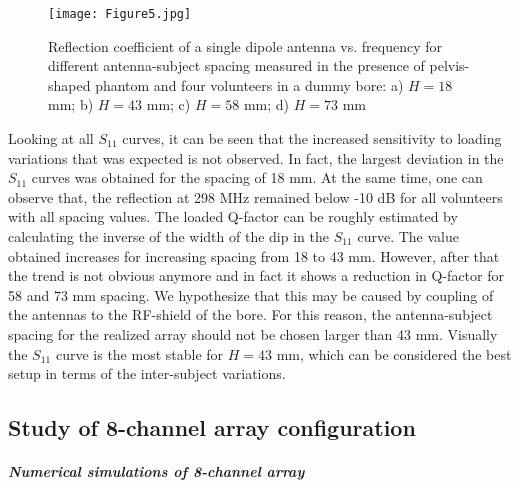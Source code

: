 \documentclass[fleqn,10pt]{wlscirep}
\begin{document}
\begin{figure}[t]
\center
\texttt{[image: Figure5.jpg]}
\caption{Reflection coefficient of a single dipole antenna vs. frequency for different antenna-subject spacing measured in the presence of pelvis-shaped phantom and four volunteers in a dummy bore: a) $H=18$ mm; b) $H=43$ mm; c) $H=58$ mm; d) $H=73$ mm}
\label{load_var}
\end{figure}

Looking at all $S_{11}$ curves, it can be seen that the increased sensitivity to loading variations that was expected is not observed. In fact, the largest deviation in the $S_{11}$ curves was obtained for the spacing of 18 mm. At the same time, one can observe that, the reflection at 298 MHz remained below -10 dB for all volunteers with all spacing values. The loaded Q-factor can be roughly estimated by calculating the inverse of the width of the dip in the $S_{11}$ curve. The value obtained increases for increasing spacing from 18 to 43 mm. However, after that the trend is not obvious anymore and in fact it shows a reduction in Q-factor for 58 and 73 mm spacing. We hypothesize that this may be caused by coupling of the antennas to the RF-shield of the bore. For this reason, the antenna-subject spacing for the realized array should not be chosen larger than 43 mm. Visually the $S_{11}$ curve is the most stable for $H=43$ mm, which can be considered the best setup in terms of the inter-subject variations.

\subsection*{Study of 8-channel array configuration}

\subparagraph*{Numerical simulations of 8-channel array}
\end{document}
